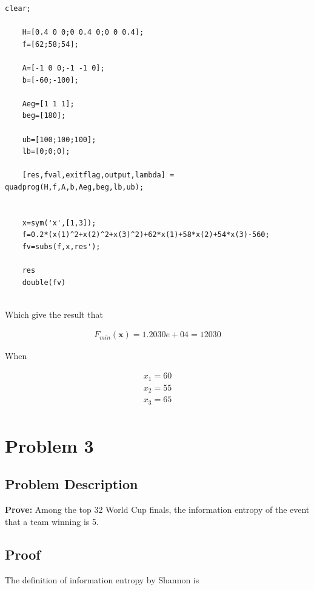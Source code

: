 \documentclass[12pt]{article}
\begin{document}
\begin{lstlisting}[style=MatlabStyle,caption=SGD Gradient Descent,label=code:p2]
	clear;
	
	H=[0.4 0 0;0 0.4 0;0 0 0.4];
	f=[62;58;54];
	
	A=[-1 0 0;-1 -1 0];
	b=[-60;-100];
	
	Aeg=[1 1 1];
	beg=[180];
	
	ub=[100;100;100];
	lb=[0;0;0];
	
	[res,fval,exitflag,output,lambda] = quadprog(H,f,A,b,Aeg,beg,lb,ub);
	
	
	x=sym('x',[1,3]);
	f=0.2*(x(1)^2+x(2)^2+x(3)^2)+62*x(1)+58*x(2)+54*x(3)-560;
	fv=subs(f,x,res');
	
	res
	double(fv)
	
\end{lstlisting}

Which give the result that

\begin{equation}
	\begin{aligned}
		F_{min}(\mathbf{x})=1.2030e+04=12030
	\end{aligned}
\end{equation}

When

\begin{equation}
	\begin{aligned}
		x_1 = 60 \\
		x_2 = 55 \\
		x_3 = 65 \\
	\end{aligned}
\end{equation}

\section{Problem 3}

\subsection{Problem Description}
\textbf{Prove:} Among the top 32 World Cup finals, the information entropy of the event that a team winning is 5.

\subsection{Proof}

The definition of information entropy by Shannon is
\end{document}
